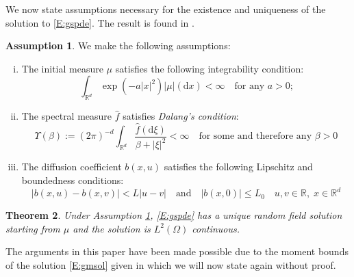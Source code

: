 \documentclass[a4paper,11pt]{article}%
\numberwithin{equation}{section}
\theoremstyle{plain}
\newtheorem{theorem}{Theorem}[section]
\theoremstyle{definition}
\newtheorem{assumptions}[theorem]{Assumption}
\newtheorem{notation}[theorem]{Notation}
\newcommand{\R}{\mathbb{R}}
\newcommand{\ud}{\ensuremath{ \mathrm{d} }}
\begin{document}
We now state assumptions necessary for the existence and uniqueness of the solution to \eqref{E:gspde}. The result is
found in \cite{CH16Comparison,CK15SHE}.

\begin{assumptions}
	\label{A:General}
	We make the following assumptions:
	\begin{enumerate}[(i)]
		\item The initial measure $\mu$ satisfies the following integrability condition:
			\begin{equation}
				\int_{\R^d}\exp\left(-a|x|^2\right)|\mu|(\ud x) < \infty \quad \text{for any $a>0$;} \label{A:icon}
			\end{equation}
		\item The spectral measure $\hat{f}$ satisfies {\it Dalang's condition}:
			\begin{equation}
				\Upsilon(\beta) := (2\pi)^{-d}\int_{\R^d}\dfrac{\hat f(\ud \xi)}{\beta + |\xi|^2} <
				\infty \quad \text{for some and therefore any $\beta>0$}  \label{A:dalcon}
			\end{equation}
		\item The diffusion coefficient $b(x,u)$ satisfies the following Lipschitz and boundedness conditions:
			\begin{equation}
				|b(x,u)-b(x,v)|< L |u-v| \quad \text{and} \quad |b(x,0)| \le L_0 \quad u,v \in \R, \; x \in \R^d \label{A:lipcon}
			\end{equation}
	\end{enumerate}
\end{assumptions}



\begin{theorem}
Under Assumption \ref{A:General}, \eqref{E:gspde} has a unique random field solution starting from $\mu$ and the solution is $L^2(\Omega)$ continuous.
\end{theorem}

The arguments in this paper have been made possible due to the moment bounds of the solution \eqref{E:gmsol} given in \cite{CH16Comparison} which we will now state again without proof.
\end{document}
